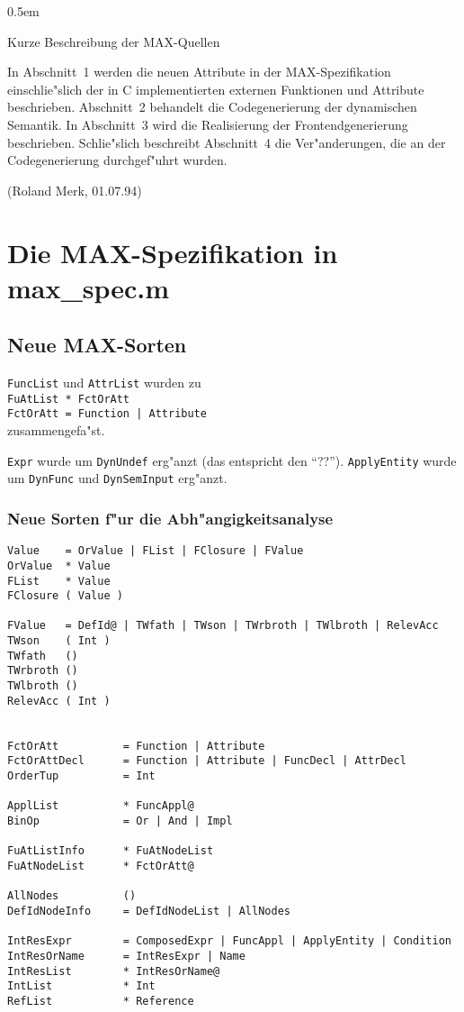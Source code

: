 
\pagestyle{headings}


\parskip 0.5em
\parindent 0pt

{\LARGE\bf\centerline{Kurze Beschreibung der MAX-Quellen}}

In Abschnitt~1 werden die neuen Attribute in der MAX-Spezifikation einschlie"slich
der in C implementierten externen Funktionen und Attribute beschrieben.
Abschnitt~2 behandelt die Codegenerierung der dynamischen Semantik.
In Abschnitt~3 wird die Realisierung der Frontendgenerierung beschrieben.
Schlie"slich beschreibt Abschnitt~4 die Ver"anderungen, die an der Codegenerierung
durchgef"uhrt wurden.


\bigskip (Roland Merk, 01.07.94)
\tableofcontents

\newpage
\section{Die MAX-Spezifikation in max\_spec.m}


\subsection{Neue MAX-Sorten}

{\tt FuncList} und {\tt AttrList} wurden zu\\
{\tt FuAtList * FctOrAtt\\
     FctOrAtt = Function | Attribute}\\
zusammengefa"st.


{\tt Expr} wurde um {\tt DynUndef} erg"anzt (das entspricht den "`??"').
{\tt ApplyEntity} wurde um {\tt DynFunc} und {\tt DynSemInput} erg"anzt.


\subsubsection{Neue Sorten f"ur die Abh"angigkeitsanalyse}

\begin{verbatim}
Value    = OrValue | FList | FClosure | FValue
OrValue  * Value
FList    * Value
FClosure ( Value )

FValue   = DefId@ | TWfath | TWson | TWrbroth | TWlbroth | RelevAcc
TWson    ( Int )
TWfath   ()
TWrbroth ()
TWlbroth ()
RelevAcc ( Int )


FctOrAtt          = Function | Attribute
FctOrAttDecl      = Function | Attribute | FuncDecl | AttrDecl
OrderTup          = Int

ApplList          * FuncAppl@
BinOp             = Or | And | Impl

FuAtListInfo      * FuAtNodeList
FuAtNodeList      * FctOrAtt@

AllNodes          ()
DefIdNodeInfo     = DefIdNodeList | AllNodes

IntResExpr        = ComposedExpr | FuncAppl | ApplyEntity | Condition
IntResOrName      = IntResExpr | Name
IntResList        * IntResOrName@
IntList           * Int
RefList           * Reference
\end{verbatim}

